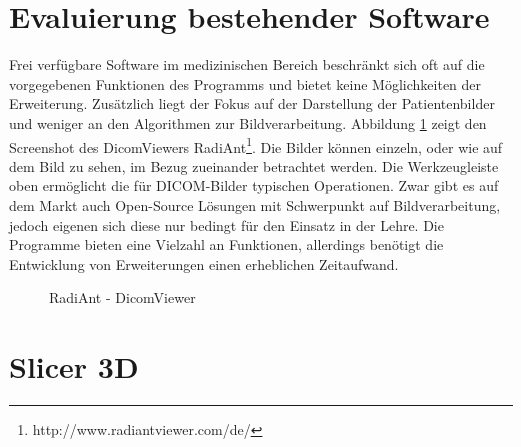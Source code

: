 

\section{Evaluierung bestehender Software}

Frei verfügbare Software im medizinischen Bereich beschränkt sich oft auf die vorgegebenen Funktionen des Programms und bietet keine Möglichkeiten der Erweiterung. Zusätzlich liegt der Fokus auf der Darstellung der Patientenbilder und weniger an den Algorithmen zur Bildverarbeitung. Abbildung \ref{radiant} zeigt den Screenshot des DicomViewers RadiAnt\footnote{http://www.radiantviewer.com/de/}. Die Bilder können einzeln, oder wie auf dem Bild zu sehen, im Bezug zueinander betrachtet werden. Die Werkzeugleiste oben ermöglicht die für DICOM-Bilder typischen Operationen.
Zwar gibt es auf dem Markt auch Open-Source Lösungen mit Schwerpunkt auf Bildverarbeitung, jedoch eigenen sich diese nur bedingt für den Einsatz in der Lehre. Die Programme bieten eine Vielzahl an Funktionen, allerdings benötigt die Entwicklung von Erweiterungen einen erheblichen Zeitaufwand.
 
\begin{figure}[htbp]
  \vspace{0.5cm}
  \centering
   \caption{RadiAnt - DicomViewer}
  \label{radiant}
  \vspace{0.5cm}
\end{figure}


\section{Slicer 3D}

